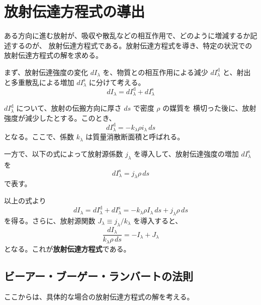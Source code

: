 \documentclass[book]{dennou777}
\newcommand{\hmemph}[1]{\textbf{#1}}
\begin{document}
\section{放射伝達方程式の導出}
ある方向に進む放射が、吸収や散乱などの相互作用で、どのように増減するか記述するのが、
放射伝達方程式である。放射伝達方程式を導き、特定の状況での放射伝達方程式の解を求める。

まず、放射伝達強度の変化 $dI_\lambda$ を、物質との相互作用による減少
$dI_\lambda^\mathrm{d}$ と、射出と多重散乱による増加 $dI_\lambda^\mathrm{s}$ に分けて考える。
\begin{equation}
	dI_\lambda=dI_\lambda^\mathrm{d}+dI_\lambda^\mathrm{s}
\end{equation}

$dI_\lambda^\mathrm{d}$ について、放射の伝搬方向に厚さ $ds$ で密度 $\rho$ の媒質を
横切った後に、放射強度が減少したとする。このとき、
\begin{equation}
	dI_\lambda^\mathrm{d}=-k_\lambda\rho i_\lambda\,ds
\end{equation}
となる。ここで、係数 $k_\lambda$ は質量消散断面積と呼ばれる。

一方で、以下の式によって放射源係数 $j_\lambda$ を導入して、放射伝達強度の増加
$dI_\lambda^\mathrm{s}$ を
\begin{equation}
	dI_\lambda^\mathrm{s}=j_\lambda\rho\,ds
\end{equation}
で表す。

以上の式より
\begin{equation}
	dI_\lambda=dI_\lambda^\mathrm{d}+dI_\lambda^\mathrm{s}
	=-k_\lambda\rho I_\lambda\,ds+j_\lambda\rho\,ds
\end{equation}
を得る。さらに、放射源関数 $J_\lambda\equiv j_\lambda/k_\lambda$ を導入すると、
\begin{equation}
	\frac{dI_\lambda}{k_\lambda\rho\,ds}=-I_\lambda+J_\lambda
\end{equation}
となる。これが\hmemph{放射伝達方程式}である。

\subsection{ビーアー・ブーゲー・ランバートの法則}
ここからは、具体的な場合の放射伝達方程式の解を考える。
\end{document}
